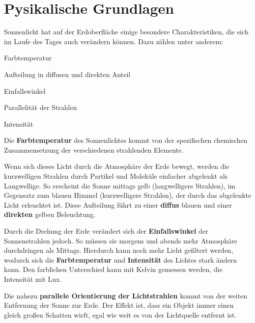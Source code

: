 \chapter{Pysikalische Grundlagen}

Sonnenlicht hat auf der Erdoberfläche einige besondere Charakteristiken, die sich im Laufe des Tages auch verändern können. Dazu zählen unter anderem:

\begin{compactitem}
	\item Farbtemperatur
	\item Aufteilung in diffusen und direkten Anteil
	\item Einfallswinkel
	\item Parallelität der Strahlen
	\item Intensität
\end{compactitem}

Die \textbf{Farbtemperatur} des Sonnenlichtes kommt von der spezifischen chemischen Zusammensetzung der verschiedenen strahlenden Elemente. 

Wenn sich dieses Licht durch die Atmosphäre der Erde bewegt, werden die kurzwelligen Strahlen durch Partikel und Moleküle einfacher abgelenkt als Langwellige. So erscheint die Sonne mittags gelb (langwelligere Strahlen), im Gegensatz zum blauen Himmel (kurzwelligere Strahlen), der durch das abgelenkte Licht erleuchtet ist. Diese Aufteilung führt zu einer \textbf{diffus} blauen und einer \textbf{direkten} gelben Beleuchtung.

Durch die Drehung der Erde verändert sich der \textbf{Einfallswinkel} der Sonnenstrahlen jedoch. So müssen sie morgens und abends mehr Atmosphäre durchdringen als Mittags. Hierdurch kann noch mehr Licht gefiltert werden, wodurch sich die \textbf{Farbtemperatur} und \textbf{Intensität} des Lichtes stark ändern kann. Den farblichen Unterschied kann mit Kelvin gemessen werden, die Intensität mit Lux.

Die nahezu \textbf{parallele Orientierung der Lichtstrahlen} kommt von der weiten Entfernung der Sonne zur Erde. Der Effekt ist, dass ein Objekt immer einen gleich großen Schatten wirft, egal wie weit es von der Lichtquelle entfernt ist.
